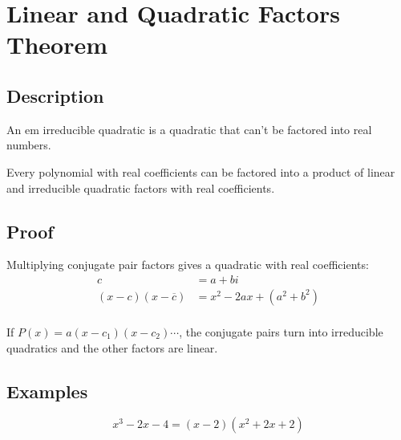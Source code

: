 \documentclass{exam}
\begin{document}
\section{Linear and Quadratic Factors Theorem}

\subsection{Description}
An {em irreducible quadratic} is a quadratic that can't be factored into real numbers.

Every polynomial with real coefficients can be factored into a product of linear and irreducible quadratic factors with
real coefficients.

\subsection{Proof}

Multiplying conjugate pair factors gives a quadratic with real coefficients:
\begin{align*}
  c                         &= a + bi \\
  (x - c)(x - \overline{c}) &= x^2 - 2ax + (a^2 + b^2) \\
\end{align*}

If $P(x) = a(x - c_1)(x - c_2) \cdots$, the conjugate pairs turn into irreducible quadratics and the other factors are
linear.

\subsection{Examples}

\[
  x^3-2 x-4 = (x-2) \left(x^2+2 x+2\right)
\]
\end{document}
